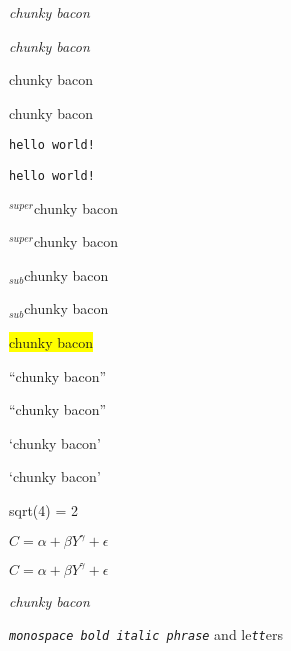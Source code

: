


\emph{chunky bacon}


\emph{chunky bacon}


chunky bacon


chunky bacon


{\tt hello world!}


{\tt hello world!}


${}^{super}$chunky bacon


${}^{super}$chunky bacon


${}_{sub}$chunky bacon


${}_{sub}$chunky bacon


\colorbox{yellow}{ chunky bacon}


``chunky bacon''


``chunky bacon''


`chunky bacon'


`chunky bacon'


sqrt(4) = 2


$C = \alpha + \beta Y^{\gamma} + \epsilon$


$C = \alpha + \beta Y^{\gamma} + \epsilon$


\emph{chunky bacon}


{\tt \emph{monospace bold italic phrase}} and le{\tt \emph{tt}}ers


